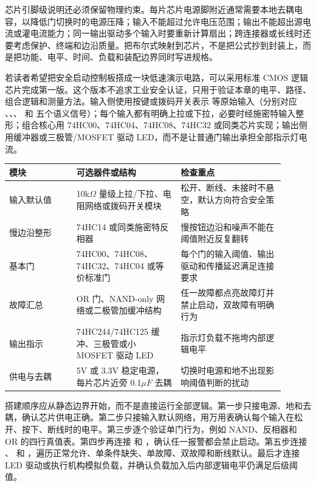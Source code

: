 芯片引脚级说明还必须保留物理约束。每片芯片电源脚附近通常需要本地去耦电容，以降低门切换时的电源压降；输入不能超过允许电压范围；输出不能超出源电流或灌电流能力；同一输出驱动多个输入时要重新计算扇出；跨连接器或长线时还要考虑保护、终端和边沿质量。把布尔式映射到芯片，不是把公式抄到封装上，而是把功能、电平、时间、负载和装配边界同时写进规格。

若读者希望把安全启动控制板搭成一块低速演示电路，可以采用标准 CMOS 逻辑芯片完成第一版。这个版本不追求工业安全认证，只用于验证本章的电平、路径、组合逻辑和测量方法。输入侧使用按键或拨码开关表示  等原始输入（分别对应 、、、 和  五个语义信号）；每个输入都有明确上拉或下拉，必要时经施密特输入整形；组合核心用 74HC00、74HC04、74HC08、74HC32 或同类芯片实现；输出侧用缓冲器或三极管/MOSFET 驱动 LED，而不是让普通门输出承担全部指示灯电流。

\begin{longtable}{L{0.22\linewidth}L{0.34\linewidth}L{0.34\linewidth}}
\toprule
模块 & 可选器件或结构 & 检查重点 \\
\midrule
输入默认值 & 10k$\Omega$ 量级上拉/下拉、电阻网络或拨码开关模块 & 松开、断线、未接时不悬空，默认方向符合安全策略 \\\tablerowrule
慢边沿整形 & 74HC14 或同类施密特反相器 & 慢按钮边沿和噪声不能在阈值附近反复翻转 \\\tablerowrule
基本门 & 74HC00、74HC08、74HC32、74HC04 或等价标准门 & 每个门的输入阈值、输出驱动和传播延迟满足连接要求 \\\tablerowrule
故障汇总 & OR 门、NAND-only 网络或二极管加缓冲结构 & 任一故障都点亮故障灯并禁止启动，双故障有明确行为 \\\tablerowrule
输出指示 & 74HC244/74HC125 缓冲、三极管或小 MOSFET 驱动 LED & 指示灯负载不拖垮内部逻辑电平 \\\tablerowrule
供电与去耦 & 5V 或 3.3V 稳定电源，每片芯片近旁 0.1$\mu F$ 去耦 & 切换时电源和地不出现影响阈值判断的扰动 \\
\bottomrule
\end{longtable}

搭建顺序应从静态边界开始，而不是直接运行全部逻辑。第一步只接电源、地和去耦，确认芯片供电正确。第二步只接输入默认网络，用万用表确认每个输入在松开、按下、断线时的电平。第三步逐个验证单门行为，例如 NAND、反相器和 OR 的四行真值表。第四步再连接  和 ，确认任一报警都会禁止启动。第五步连接 、 和 ，遍历正常允许、单条件缺失、单故障、双故障和断线默认。最后才连接 LED 驱动或执行机构模拟负载，并确认负载加入后内部逻辑电平仍满足后级阈值。

